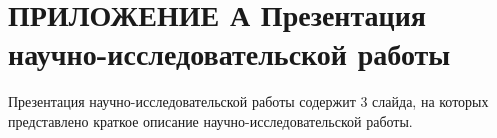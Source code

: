 \chapter*{ПРИЛОЖЕНИЕ А Презентация научно-исследовательской работы}
Презентация научно-исследовательской работы содержит 3 слайда, на которых представлено краткое описание научно-исследовательской работы.